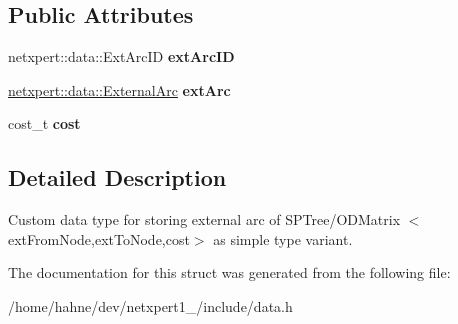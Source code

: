\subsection*{Public Attributes}
\begin{DoxyCompactItemize}
\item 
netxpert\+::data\+::\+Ext\+Arc\+ID {\bfseries ext\+Arc\+ID}\hypertarget{structnetxpert_1_1data_1_1ExtSPTreeArc_ab5d23ea88dab7a425dc6c9f7135f0f56}{}\label{structnetxpert_1_1data_1_1ExtSPTreeArc_ab5d23ea88dab7a425dc6c9f7135f0f56}

\item 
\hyperlink{structnetxpert_1_1data_1_1ExternalArc}{netxpert\+::data\+::\+External\+Arc} {\bfseries ext\+Arc}\hypertarget{structnetxpert_1_1data_1_1ExtSPTreeArc_ab867b9d9f89891afd0b789f806b94b60}{}\label{structnetxpert_1_1data_1_1ExtSPTreeArc_ab867b9d9f89891afd0b789f806b94b60}

\item 
cost\+\_\+t {\bfseries cost}\hypertarget{structnetxpert_1_1data_1_1ExtSPTreeArc_a9c473340c0d1071a14eed68f5750f37f}{}\label{structnetxpert_1_1data_1_1ExtSPTreeArc_a9c473340c0d1071a14eed68f5750f37f}

\end{DoxyCompactItemize}


\subsection{Detailed Description}
Custom data type for storing external arc of S\+P\+Tree/\+O\+D\+Matrix $<$ext\+From\+Node,ext\+To\+Node,cost$>$ as simple type variant. 

The documentation for this struct was generated from the following file\+:\begin{DoxyCompactItemize}
\item 
/home/hahne/dev/netxpert1\+\_/include/data.\+h\end{DoxyCompactItemize}
